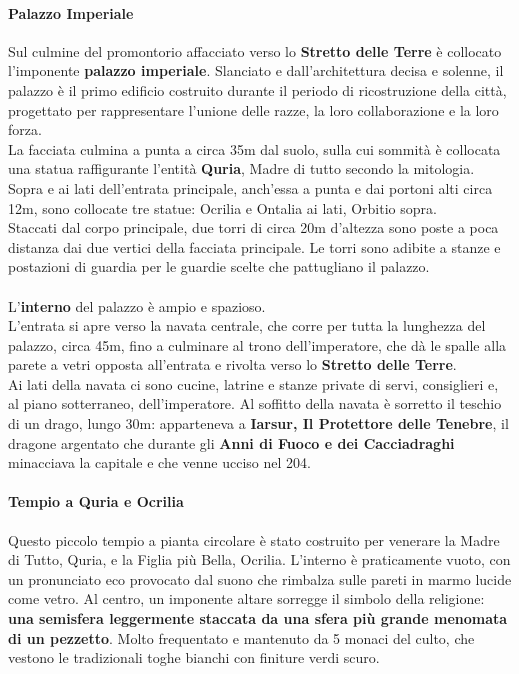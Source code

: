 \documentclass[10pt,twoside,onecolumn,openany]{book}
\begin{document}
\paragraph{Palazzo Imperiale}
Sul culmine del promontorio affacciato verso lo \textbf{Stretto delle Terre} è collocato l'imponente \textbf{palazzo imperiale}. Slanciato e dall'architettura decisa e solenne, il palazzo è il primo edificio costruito durante il periodo di ricostruzione della città, progettato per rappresentare l'unione delle razze, la loro collaborazione e la loro forza.\\
La facciata culmina a punta a circa 35m dal suolo, sulla cui sommità è collocata una statua raffigurante l'entità \textbf{Quria}, Madre di tutto secondo la mitologia. Sopra e ai lati dell'entrata principale, anch'essa a punta e dai portoni alti circa 12m, sono collocate tre statue: Ocrilia e Ontalia ai lati, Orbitio sopra.\\
Staccati dal corpo principale, due torri di circa 20m d'altezza sono poste a poca distanza dai due vertici della facciata principale. Le torri sono adibite a stanze e postazioni di guardia per le guardie scelte che pattugliano il palazzo.\\
\\
L'\textbf{interno} del palazzo è ampio e spazioso.\\
L'entrata si apre verso la navata centrale, che corre per tutta la lunghezza del palazzo, circa 45m, fino a culminare al trono dell'imperatore, che dà le spalle alla parete a vetri opposta all'entrata e rivolta verso lo \textbf{Stretto delle Terre}.\\
Ai lati della navata ci sono cucine, latrine e stanze private di servi, consiglieri e, al piano sotterraneo, dell'imperatore. Al soffitto della navata è sorretto il teschio di un drago, lungo 30m: apparteneva a \textbf{Iarsur, Il Protettore delle Tenebre}, il dragone argentato che durante gli \textbf{Anni di Fuoco e dei Cacciadraghi} minacciava la capitale e che venne ucciso nel 204.
\paragraph{Tempio a Quria e Ocrilia}
Questo piccolo tempio a pianta circolare è stato costruito per venerare la Madre di Tutto, Quria, e la Figlia più Bella, Ocrilia. L'interno è praticamente vuoto, con un pronunciato eco provocato dal suono che rimbalza sulle pareti in marmo lucide come vetro. Al centro, un imponente altare sorregge il simbolo della religione: \textbf{una semisfera leggermente staccata da una sfera più grande menomata di un pezzetto}. Molto frequentato e mantenuto da 5 monaci del culto, che vestono le tradizionali toghe bianchi con finiture verdi scuro.
\end{document}
